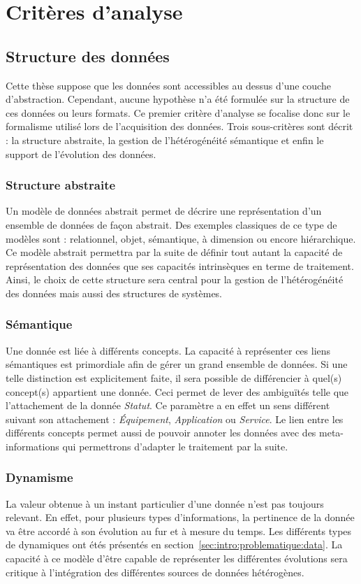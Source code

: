 \section{Critères d'analyse}
\subsection{Structure des données}
Cette thèse suppose que les données sont accessibles au dessus d'une couche d'abstraction. Cependant, aucune hypothèse n'a été formulée sur la structure de ces données ou leurs formats. Ce premier critère d'analyse se focalise donc sur le formalisme utilisé lors de l'acquisition des données. Trois sous-critères sont décrit : la structure abstraite, la gestion de l'hétérogénéité sémantique et enfin le support de l'évolution des données.

\subsubsection{Structure abstraite}
Un modèle de données abstrait permet de décrire une représentation d'un ensemble de données de façon abstrait. Des exemples classiques de ce type de modèles sont : relationnel, objet, sémantique, à dimension ou encore hiérarchique. Ce modèle abstrait permettra par la suite de définir tout autant la capacité de représentation des données que ses capacités intrinsèques en terme de traitement. Ainsi, le choix de cette structure sera central pour la gestion de l'hétérogénéité des données mais aussi des structures de systèmes.
\subsubsection{Sémantique}
Une donnée est liée à différents concepts. La capacité à représenter ces liens sémantiques est primordiale afin de gérer un grand ensemble de données. Si une telle distinction est explicitement faite, il sera possible de différencier à quel(s) concept(s) appartient une donnée. Ceci permet de lever des ambiguïtés telle que l'attachement de la donnée \textit{Statut}. Ce paramètre a en effet un sens différent suivant son attachement : \textit{Équipement}, \textit{Application} ou \textit{Service}. Le lien entre les différents concepts permet aussi de pouvoir annoter les données avec des meta-informations qui permettrons d'adapter le traitement par la suite.
\subsubsection{Dynamisme}
La valeur obtenue à un instant particulier d'une donnée n'est pas toujours relevant. En effet, pour plusieurs types d'informations, la pertinence de la donnée va être accordé à son évolution au fur et à mesure du temps. Les différents types de dynamiques ont étés présentés en section~\ref{sec:intro:problematique:data}. La capacité à ce modèle d'être capable de représenter les différentes évolutions sera critique à l'intégration des différentes sources de données hétérogènes.

